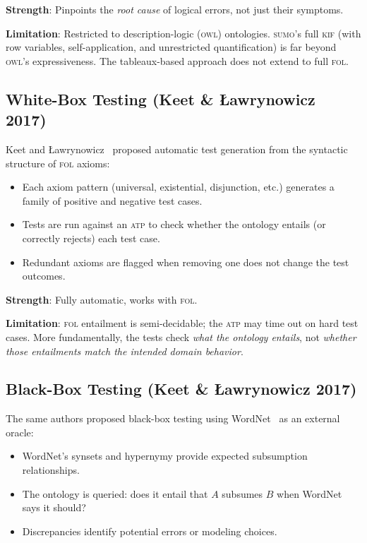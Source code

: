 \documentclass[11pt]{article}
\newcommand{\KIF}{\textsc{kif}}
\newcommand{\SUMO}{\textsc{sumo}}
\newcommand{\OWL}{\textsc{owl}}
\newcommand{\FOL}{\textsc{fol}}
\newcommand{\ATP}{\textsc{atp}}
\theoremstyle{definition}
\theoremstyle{plain}
\begin{document}
\textbf{Strength}: Pinpoints the \emph{root cause} of logical errors,
not just their symptoms.

\textbf{Limitation}: Restricted to description-logic (\OWL{}) ontologies.
\SUMO{}'s full \KIF{} (with row variables, self-application, and
unrestricted quantification) is far beyond \OWL{}'s expressiveness.
The tableaux-based approach does not extend to full \FOL{}.

\subsection{White-Box Testing (Keet \& \L{}awrynowicz 2017)}

Keet and \L{}awrynowicz~\cite{keet2017whitebox} proposed automatic test
generation from the syntactic structure of \FOL{} axioms:
\begin{itemize}[nosep]
  \item Each axiom pattern (universal, existential, disjunction, etc.)
    generates a family of positive and negative test cases.
  \item Tests are run against an \ATP{} to check whether the ontology
    entails (or correctly rejects) each test case.
  \item Redundant axioms are flagged when removing one does not change
    the test outcomes.
\end{itemize}

\textbf{Strength}: Fully automatic, works with \FOL{}.

\textbf{Limitation}: \FOL{} entailment is semi-decidable; the \ATP{}
may time out on hard test cases.
More fundamentally, the tests check \emph{what the ontology entails},
not \emph{whether those entailments match the intended domain
behavior}.

\subsection{Black-Box Testing (Keet \& \L{}awrynowicz 2017)}

The same authors proposed black-box testing using
WordNet~\cite{keet2017blackbox} as an external oracle:
\begin{itemize}[nosep]
  \item WordNet's synsets and hypernymy provide expected subsumption
    relationships.
  \item The ontology is queried: does it entail that $A$ subsumes $B$
    when WordNet says it should?
  \item Discrepancies identify potential errors or modeling choices.
\end{itemize}
\end{document}
